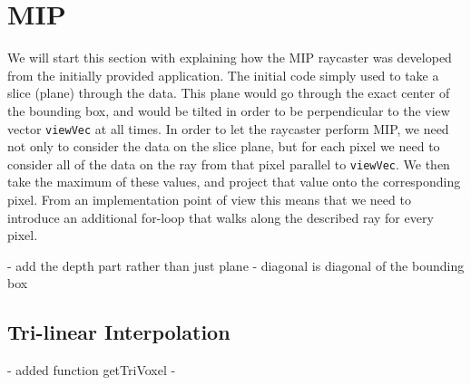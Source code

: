
\section{MIP}\label{sec:mip}
We will start this section with explaining how the MIP raycaster was developed from the initially provided application. The initial code simply used to take a slice (plane) through the data. This plane would go through the exact center of the bounding box, and would be tilted in order to be perpendicular to the view vector \texttt{viewVec} at all times. In order to let the raycaster perform MIP, we need not only to consider the data on the slice plane, but for each pixel we need to consider all of the data on the ray from that pixel parallel to \texttt{viewVec}. We then take the maximum of these values, and project that value onto the corresponding pixel. From an implementation point of view this means that we need to introduce an additional for-loop that walks along the described ray for every pixel. 


- add the depth part rather than just plane
- diagonal is diagonal of the bounding box

\subsection{Tri-linear Interpolation}\label{subsec:tri_linear}
- added function getTriVoxel
- %

